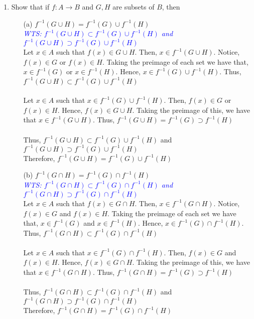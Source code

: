 \documentclass[12pt]{article}
\newcommand{\wts}[1]{\textit{\textcolor{blue}{WTS: #1}}\\}
\begin{document}
\begin{enumerate}
    \item Show that if $f:A \to B$ and $G, H$ are subsets of $B$, then
    \begin{itemize}
        \item[(a)] $f^{-1}(G \cup H) = f^{-1}(G) \cup f^{-1}(H)$\\
        \wts{$f^{-1}(G \cup H) \subset f^{-1}(G) \cup f^{-1}(H)$ and $f^{-1}(G \cup H) \supset f^{-1}(G) \cup f^{-1}(H)$}
        Let $x \in A $ such that $ f(x)\in G\cup H $. Then, $ x\in f^{-1}(G\cup H) $. Notice, $ f(x)\in G $ or $ f(x)\in H $. Taking the preimage of each set we have that, $ x\in f^{-1}(G) $ or $ x\in f^{-1}(H) $. Hence, $ x\in f^{-1}(G)\cup f^{-1}(H) $. Thus, $f^{-1}(G \cup H) \subset f^{-1}(G) \cup f^{-1}(H)$ \\
        \\
        Let $ x\in A $ such that $ x\in f^{-1}(G)\cup f^{-1}(H)$. Then, $ f(x)\in G $ or $f(x)\in H $. Hence, $ f(x)\in G\cup H $. Taking the preimage of this, we have that $ x\in f^{-1}(G\cup H) $. Thus,  $f^{-1}(G \cup H) = f^{-1}(G) \supset f^{-1}(H)$\\
        \\
        Thus, $f^{-1}(G \cup H) \subset f^{-1}(G) \cup f^{-1}(H)$ and $f^{-1}(G \cup H) \supset f^{-1}(G) \cup f^{-1}(H)$\\
        Therefore, $f^{-1}(G \cup H) = f^{-1}(G) \cup f^{-1}(H)$
        \item[(b)] $f^{-1}(G \cap H) = f^{-1}(G) \cap f^{-1}(H)$\\
	     \wts{$f^{-1}(G \cap H) \subset f^{-1}(G) \cap f^{-1}(H)$ and $f^{-1}(G \cap H) \supset f^{-1}(G) \cap f^{-1}(H)$}
	     Let $x \in A $ such that $ f(x)\in G\cap H $. Then, $ x\in f^{-1}(G\cap H) $. Notice, $ f(x)\in G $ and $ f(x)\in H $. Taking the preimage of each set we have that, $ x\in f^{-1}(G) $ and $ x\in f^{-1}(H) $. Hence, $ x\in f^{-1}(G)\cap f^{-1}(H) $. Thus, $f^{-1}(G \cap H) \subset f^{-1}(G) \cap f^{-1}(H)$ \\
	     \\
	     Let $ x\in A $ such that $ x\in f^{-1}(G)\cap f^{-1}(H)$. Then, $ f(x)\in G $ and $f(x)\in H $. Hence, $ f(x)\in G\cap H $. Taking the preimage of this, we have that $ x\in f^{-1}(G\cap H) $. Thus,  $f^{-1}(G \cap H) = f^{-1}(G) \supset f^{-1}(H)$\\
	     \\
	     Thus, $f^{-1}(G \cap H) \subset f^{-1}(G) \cap f^{-1}(H)$ and $f^{-1}(G \cap H) \supset f^{-1}(G) \cap f^{-1}(H)$\\
	     Therefore, $f^{-1}(G \cap H) = f^{-1}(G) \cap f^{-1}(H)$
    \end{itemize}  


\end{enumerate}
\end{document}
